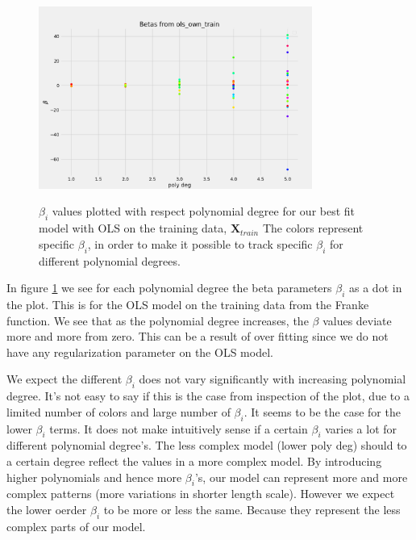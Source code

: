 \begin{figure}[H]
    \centering
    \includegraphics[width=0.8\textwidth]{Figures/b_beta.png}
    \label{fig:beta_plot}
    \caption{ $\beta _i$ values plotted with respect polynomial degree for our best
    fit model with OLS on the training data, $\bm{X} _{train} $ 
    The colors represent specific $\beta _i$, in order to make it possible to
    track specific $\beta _i$ for different polynomial degrees.      }
\end{figure}

In figure \ref{fig:beta_plot} we see for each polynomial degree the beta
parameters $\beta_i$ as a dot in the plot. This is for the OLS model on the
training data from the Franke function. We see that as the polynomial degree increases, the $\beta$
values deviate more and more from zero. This can be a result of over fitting
since we do not have any regularization parameter on the OLS model.

We expect the different $\beta _i$ does not vary significantly with increasing
polynomial degree. It's not easy to say if this is the case from inspection of
the plot, due to a limited number of colors and large number of $\beta _i$. It seems to be the case for the
lower $\beta _i$ terms. It does not make intuitively sense if a certain $\beta _i$ varies a
lot for different polynomial degree's. The less complex model (lower poly deg) should to a certain degree
reflect the values in a more complex model. By introducing higher polynomials
and hence more $\beta _i$'s, our model can represent more and more complex
patterns (more variations in shorter length scale). However we expect the lower
oerder $\beta _i$ to be more or less the same. Because they represent the less
complex parts of our model. 
 


